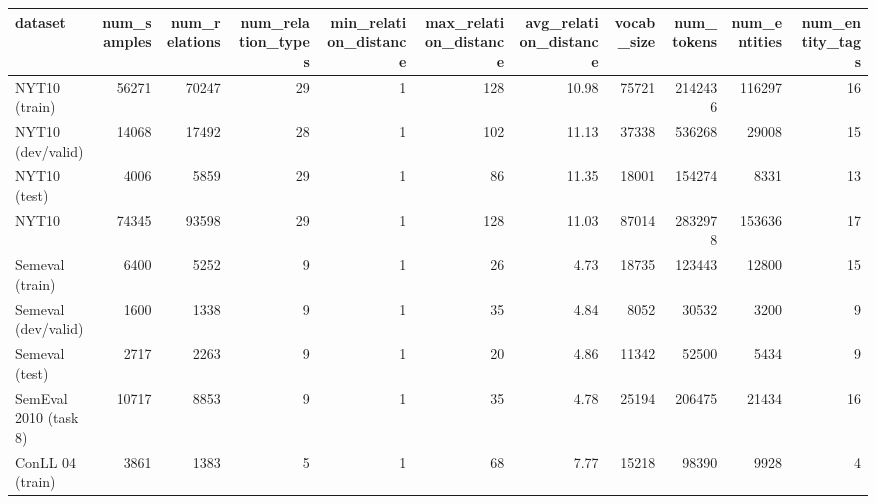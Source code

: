 \begin{tabular}{lrrrrrrrrrr}
\hline
 dataset               &   num_samples &   num_relations &   num_relation_types &   min_relation_distance &   max_relation_distance &   avg_relation_distance &   vocab_size &   num_tokens &   num_entities &   num_entity_tags \\
\hline
 NYT10 (train)         &         56271 &           70247 &                   29 &                       1 &                     128 &                   10.98 &        75721 &      2142436 &         116297 &                16 \\
 NYT10 (dev/valid)     &         14068 &           17492 &                   28 &                       1 &                     102 &                   11.13 &        37338 &       536268 &          29008 &                15 \\
 NYT10 (test)          &          4006 &            5859 &                   29 &                       1 &                      86 &                   11.35 &        18001 &       154274 &           8331 &                13 \\
 NYT10                 &         74345 &           93598 &                   29 &                       1 &                     128 &                   11.03 &        87014 &      2832978 &         153636 &                17 \\
 Semeval (train)       &          6400 &            5252 &                    9 &                       1 &                      26 &                    4.73 &        18735 &       123443 &          12800 &                15 \\
 Semeval (dev/valid)   &          1600 &            1338 &                    9 &                       1 &                      35 &                    4.84 &         8052 &        30532 &           3200 &                 9 \\
 Semeval (test)        &          2717 &            2263 &                    9 &                       1 &                      20 &                    4.86 &        11342 &        52500 &           5434 &                 9 \\
 SemEval 2010 (task 8) &         10717 &            8853 &                    9 &                       1 &                      35 &                    4.78 &        25194 &       206475 &          21434 &                16 \\
 ConLL 04 (train)      &          3861 &            1383 &                    5 &                       1 &                      68 &                    7.77 &        15218 &        98390 &           9928 &                 4 \\

\end{tabular}
